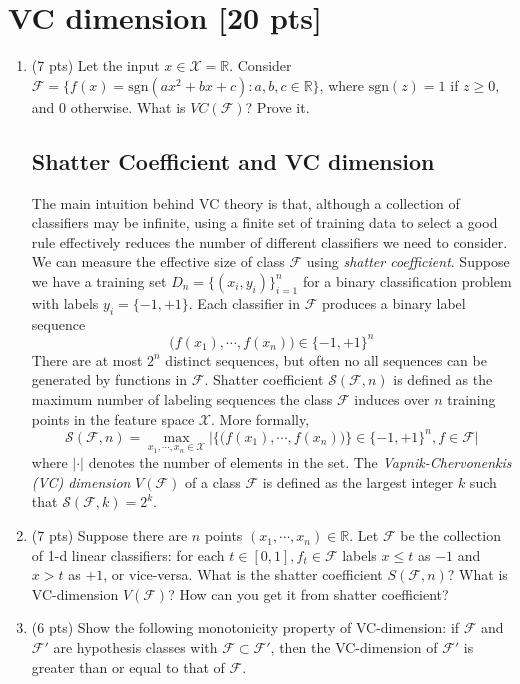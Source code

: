 \documentclass[a4paper]{article}
\theoremstyle{definition}
\newcommand{\sgn}{\mathrm{sgn}}
\def\R{\mathbb R}
\begin{document}
\section{VC dimension [20 pts]}
\begin{enumerate}
    \item (7 pts) Let the input $x\in \mathcal{X}=\R$.
Consider $\mathcal{F}=\{f(x)=\sgn(ax^2+bx+c): a, b, c \in \R\}$, where $\sgn(z)=1$ if $z\ge0$, and 0 otherwise.
What is $VC(\mathcal{F})$?  Prove it.

\subsection*{Shatter Coefficient and VC dimension}
The main intuition behind VC theory is that, although a collection of classifiers may be infinite, using a finite set of training data to select a good rule effectively reduces the number of different classifiers we need to consider. We can measure the effective size of class $\mathcal{F}$ using \textit{shatter coefficient}. Suppose we have a training set $D_n = \{(x_i, y_i)\}_{i=1}^n$ for a binary classification problem with labels $y_i = \{-1, +1\}$. Each classifier in $\mathcal{F}$ produces a binary label sequence
$$\big(f(x_1), \cdots, f(x_n)\big) \in \{-1, +1\}^n$$
There are at most $2^n$ distinct sequences, but often no all sequences can be generated by functions in $\mathcal{F}$. Shatter coefficient $\mathcal{S}(\mathcal{F}, n)$ is defined as the maximum number of labeling sequences the class $\mathcal{F}$ induces over $n$ training points in the feature space $\mathcal{X}$. More formally, 
$$\mathcal{S}(\mathcal{F}, n) = \max_{x_1, \cdots, x_n \in \mathcal{X}}
\Bigg|\Big\{\big(f(x_1), \cdots, f(x_n)\big)\Big\} \in \{-1, +1\}^n, f \in \mathcal{F}\Bigg|$$
where $|\cdot|$ denotes the number of elements in the set.
The \textit{Vapnik-Chervonenkis (VC) dimension} $V(\mathcal{F})$ of a class $\mathcal{F}$  is defined as the largest integer $k$ such that $\mathcal{S}(\mathcal{F}, k) = 2^k$. 

\item (7 pts) Suppose there are $n$ points $(x_1, \cdots, x_n)\in\R$. Let $\mathcal{F}$ be the collection of 1-d linear classifiers: for each $t\in [0, 1], f_t \in \mathcal{F}$ labels $x\leq t$ as $-1$ and $x > t$ as $+1$, or vice-versa. What is the shatter coefficient $S(\mathcal{F}, n)$? What is VC-dimension $V(\mathcal{F})$? How can you get it from shatter coefficient?
\item (6 pts) Show the following monotonicity property of VC-dimension: if $\mathcal{F}$ and $\mathcal{F}'$ are hypothesis classes with $\mathcal{F} \subset \mathcal{F}'$, then the VC-dimension of $\mathcal{F}'$ is greater than or equal to that of $\mathcal{F}$.
\end{enumerate}
\end{document}
